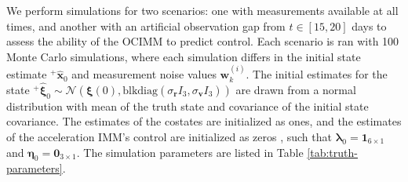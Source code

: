 \documentclass[letterpaper, preprint, paper,11pt]{AAS}	%
\begin{document}
We perform simulations for two scenarios: one with measurements available at all times, and another with an artificial observation gap from $t \in [15, 20]$ days to assess the ability of the OCIMM to predict control. Each scenario is ran with 100 Monte Carlo simulations, where each simulation differs in the initial state estimate ${}^+\hat{\bm{x}}_0$ and measurement noise values $\bm{w}_k^{(i)}$. The initial estimates for the state ${}^+\hat{\bm{\xi}}_0 \sim \mathcal{N}(\bm{\xi}(0), \text{blkdiag}(\sigma_{\bm{r}}I_3, \sigma_{\bm{v}}I_3))$ are drawn from a normal distribution with mean of the truth state and covariance of the initial state covariance. The estimates of the costates are initialized as ones, and the estimates of the acceleration IMM's control are initialized as zeros , such that $\bm{\lambda}_0 = \bm{1}_{6 \times 1}$ and $\bm{\eta}_0 = \bm{0}_{3\times1}$. The simulation parameters are listed in Table \ref{tab:truth-parameters}.
\end{document}
